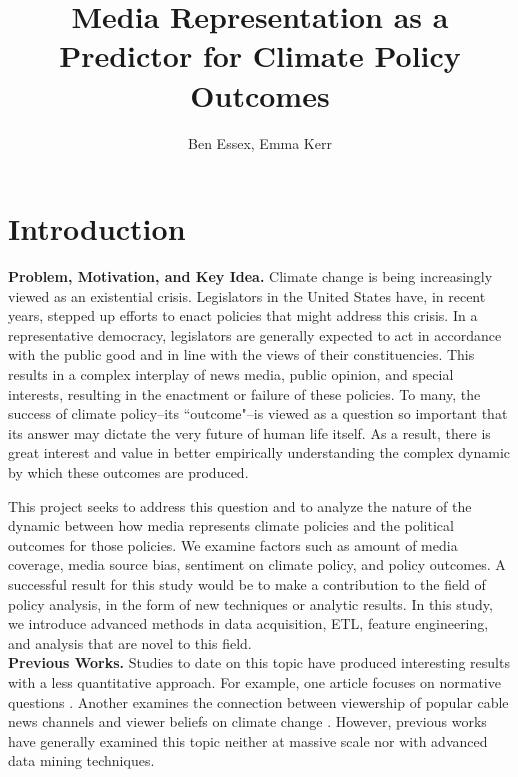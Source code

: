 \documentclass[letterpaper,11pt]{article}
\title{Media Representation as a\\ 
\vspace{.1in} 
Predictor for Climate Policy Outcomes}
\author{Ben Essex, Emma Kerr}
\date{}
\begin{document}
\maketitle


\section{Introduction}

\vspace{.1in}

\quad\textbf{Problem, Motivation, and Key Idea.}
Climate change is being increasingly viewed as an existential crisis. Legislators in the United States have, in recent years, stepped up efforts to enact policies that might address this crisis. In a representative democracy, legislators are generally expected to act in accordance with the public good and in line with the views of their constituencies. This results in a complex interplay of news media, public opinion, and special interests, resulting in the enactment or failure of these policies. To many, the success of climate policy--its ``outcome"--is viewed as a question so important that its answer may dictate the very future of human life itself. As a result, there is great interest and value in better empirically understanding the complex dynamic by which these outcomes are produced.

This project seeks to address this question and to analyze the nature of the dynamic between how media represents climate policies and the political outcomes for those policies. We examine factors such as amount of media coverage, media source bias, sentiment on climate policy, and policy outcomes. A successful result for this study would be to make a contribution to the field of policy analysis, in the form of new techniques or analytic results. In this study, we introduce advanced methods in data acquisition, ETL, feature engineering, and analysis that are novel to this field.\\

\textbf{Previous Works.}
Studies to date on this topic have produced interesting results with a less quantitative approach. For example, one article focuses on normative questions \cite{boykoff2007climate}. Another examines the connection between viewership of popular cable news channels and viewer beliefs on climate change \cite{feldman2012climate}. However, previous works have generally examined this topic neither at massive scale nor with advanced data mining techniques.
\end{document}
